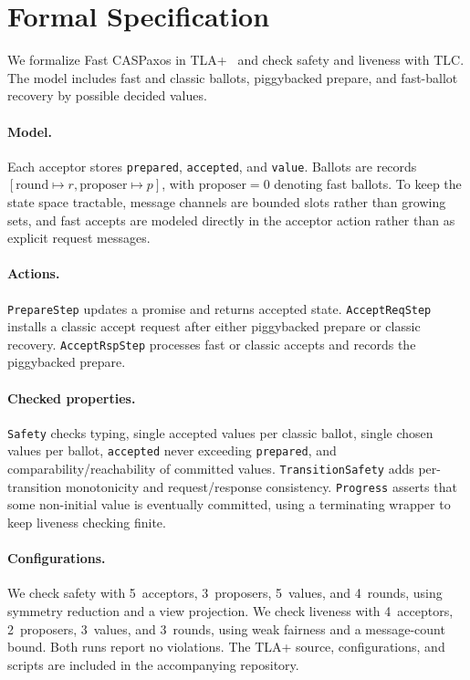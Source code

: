 \section{Formal Specification}
\label{sec:tla-specification}

We formalize Fast CASPaxos in TLA+~\cite{lamport_tla} and check safety and liveness with TLC.
The model includes fast and classic ballots, piggybacked prepare, and fast-ballot recovery by possible decided values.

\paragraph{Model.}
Each acceptor stores \texttt{prepared}, \texttt{accepted}, and \texttt{value}.
Ballots are records $[\text{round} \mapsto r, \text{proposer} \mapsto p]$, with $\text{proposer} = 0$ denoting fast ballots.
To keep the state space tractable, message channels are bounded slots rather than growing sets, and fast accepts are modeled directly in the acceptor action rather than as explicit request messages.

\paragraph{Actions.}
\texttt{PrepareStep} updates a promise and returns accepted state.
\texttt{AcceptReqStep} installs a classic accept request after either piggybacked prepare or classic recovery.
\texttt{AcceptRspStep} processes fast or classic accepts and records the piggybacked prepare.

\paragraph{Checked properties.}
\texttt{Safety} checks typing, single accepted values per classic ballot, single chosen values per ballot, \texttt{accepted} never exceeding \texttt{prepared}, and comparability/reachability of committed values.
\texttt{Transition\-Safety} adds per-transition monotonicity and request/response consistency.
\texttt{Progress} asserts that some non-initial value is eventually committed, using a terminating wrapper to keep liveness checking finite.

\paragraph{Configurations.}
We check safety with 5~acceptors, 3~proposers, 5~values, and 4~rounds, using symmetry reduction and a view projection.
We check liveness with 4~acceptors, 2~proposers, 3~values, and 3~rounds, using weak fairness and a message-count bound.
Both runs report no violations.
The TLA+ source, configurations, and scripts are included in the accompanying repository.
